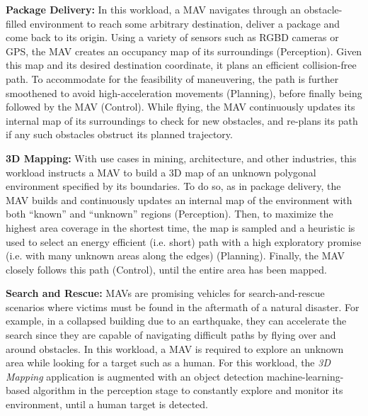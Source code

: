 \textbf{Package Delivery:} In this workload, a MAV navigates through an obstacle-filled environment to reach some arbitrary destination, deliver a package and come back to its origin. Using a variety of sensors such as RGBD cameras or GPS, the MAV creates an occupancy map of its surroundings (Perception). Given this map and its desired destination coordinate, it plans an efficient collision-free path. To accommodate for the feasibility of maneuvering, the path is further smoothened to avoid high-acceleration movements (Planning), before finally being followed by the MAV (Control). While flying, the MAV continuously updates its internal map of its surroundings to check for new obstacles, and re-plans its path if any such obstacles obstruct its planned trajectory.

\textbf{3D Mapping:} With use cases in mining, architecture, and other industries, this workload instructs a MAV to build a 3D map of an unknown polygonal environment specified by its boundaries. To do so, as in package delivery, the MAV builds and continuously updates an internal map of the environment with both ``known'' and ``unknown'' regions (Perception). Then, to maximize the highest area coverage in the shortest time, the map is sampled and a heuristic is used to select an energy efficient (i.e. short) path with a high exploratory promise (i.e. with many unknown areas along the edges) (Planning). Finally, the MAV closely follows this path (Control), until the entire area has been mapped.


\textbf{Search and Rescue:} MAVs are promising vehicles for search-and-rescue scenarios where victims must be found in the aftermath of a natural disaster. For example, in a collapsed building due to an earthquake, they can accelerate the search since they are capable of navigating difficult paths by flying over and around obstacles. In this workload, a MAV is required to explore an unknown area while looking for a target such as a human.  For this workload, the \textit{3D Mapping} application is augmented with an object detection machine-learning-based algorithm in the perception stage to constantly explore and monitor its environment, until a human target is detected.


